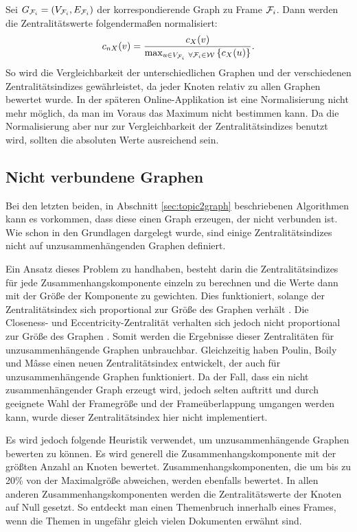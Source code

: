 Sei $G_{\mathcal{F}_i}=(V_{\mathcal{F}_i},E_{\mathcal{F}_i})$ der korrespondierende Graph zu Frame $\mathcal{F}_i$. Dann werden die Zentralitätswerte folgendermaßen normalisiert:
\begin{equation*}
c_{nX}(v) = \frac{c_{X}(v)}{\max_{u \in V_{\mathcal{F}_i}\ \forall \mathcal{F}_i \in \mathcal{W} }\left\lbrace c_{X}(u)\right\rbrace}\text{.}
\end{equation*}
So wird die Vergleichbarkeit der unterschiedlichen Graphen und der verschiedenen Zentralitätsindizes gewährleistet, da jeder Knoten relativ zu allen Graphen bewertet wurde. In der späteren Online-Applikation ist eine Normalisierung nicht mehr möglich, da man im Voraus das Maximum nicht bestimmen kann. Da die Normalisierung aber nur zur Vergleichbarkeit der Zentralitätsindizes benutzt wird, sollten die absoluten Werte ausreichend sein.

\subsection{Nicht verbundene Graphen}
Bei den letzten beiden, in Abschnitt \ref{sec:topic2graph} beschriebenen Algorithmen kann es vorkommen, dass diese einen Graph erzeugen, der nicht verbunden ist. Wie schon in den Grundlagen dargelegt wurde, sind einige Zentralitätsindizes nicht auf unzusammenhängenden Graphen definiert. 

Ein Ansatz dieses Problem zu handhaben, besteht darin die Zentralitätsindizes für jede Zusammenhangskomponente einzeln zu berechnen und die Werte dann mit der Größe der Komponente zu gewichten. Dies funktioniert, solange der Zentralitätsindex sich proportional zur Größe des Graphen verhält \citep{Brandes2005}. Die Closeness- und Eccentricity-Zentralität verhalten sich jedoch nicht proportional zur Größe des Graphen \citep{Poulin2000}. Somit werden die Ergebnisse dieser Zentralitäten für unzusammenhängende Graphen unbrauchbar. Gleichzeitig haben Poulin, Boily und Mâsse \citep{Poulin2000} einen neuen Zentralitätsindex entwickelt, der auch für unzusammenhängende Graphen funktioniert. Da der Fall, dass ein nicht zusammenhängender Graph erzeugt wird, jedoch selten auftritt und durch geeignete Wahl der Framegröße und der Frameüberlappung umgangen werden kann, wurde dieser Zentralitätsindex hier nicht implementiert. 

Es wird jedoch folgende Heuristik verwendet, um unzusammenhängende Graphen bewerten zu können. Es wird generell die Zusammenhangskomponente mit der größten Anzahl an Knoten bewertet. Zusammenhangskomponenten, die um bis zu 20\% von der Maximalgröße abweichen, werden ebenfalls bewertet. In allen anderen Zusammenhangskomponenten werden die Zentralitätswerte der Knoten auf Null gesetzt. So entdeckt man einen Themenbruch innerhalb eines Frames, wenn die Themen in ungefähr gleich vielen Dokumenten erwähnt sind. 
